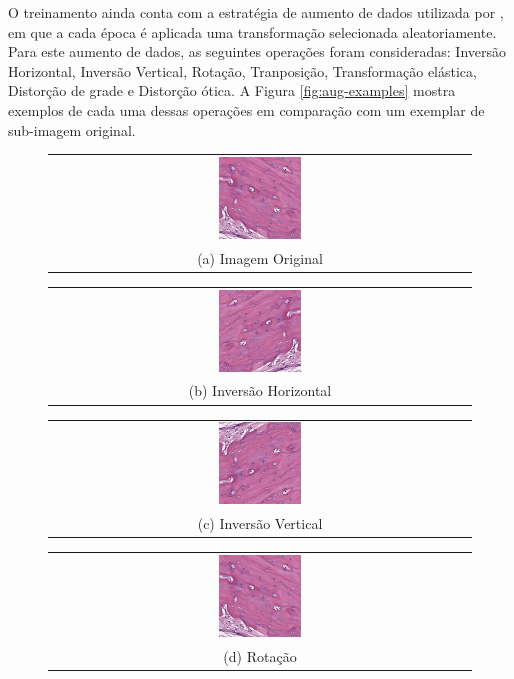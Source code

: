 O treinamento ainda conta com a estratégia de aumento de dados utilizada por \cite{Santos2023a}, em que a cada época é aplicada uma transformação selecionada aleatoriamente. Para este aumento de dados, as seguintes operações foram consideradas: Inversão Horizontal, Inversão Vertical, Rotação, Tranposição, Transformação elástica, Distorção de grade e Distorção ótica. A Figura \ref{fig:aug-examples} mostra exemplos de cada uma dessas operações em comparação com um exemplar de sub-imagem original.

\begin{figure}[h]
    \center
    \begin{tabular}{@{}c@{}}
        \includegraphics[width=0.2\textwidth]{figures/3_methods/transformations/205_r3c7.png}\\[\abovecaptionskip]
    \small (a) Imagem Original
    \end{tabular}
    \begin{tabular}{@{}c@{}}
        \includegraphics[width=0.2\textwidth]{figures/3_methods/transformations/205_r3c7_hflip.png}\\[\abovecaptionskip]
    \small (b) Inversão Horizontal
    \end{tabular}
    \begin{tabular}{@{}c@{}}
        \includegraphics[width=0.2\textwidth]{figures/3_methods/transformations/205_r3c7_vflip.png}\\[\abovecaptionskip]
    \small (c) Inversão Vertical
    \end{tabular}
    \begin{tabular}{@{}c@{}}
        \includegraphics[width=0.2\textwidth]{figures/3_methods/transformations/205_r3c7_rotation.png}\\[\abovecaptionskip]
    \small (d) Rotação
    \end{tabular}


\end{figure}
